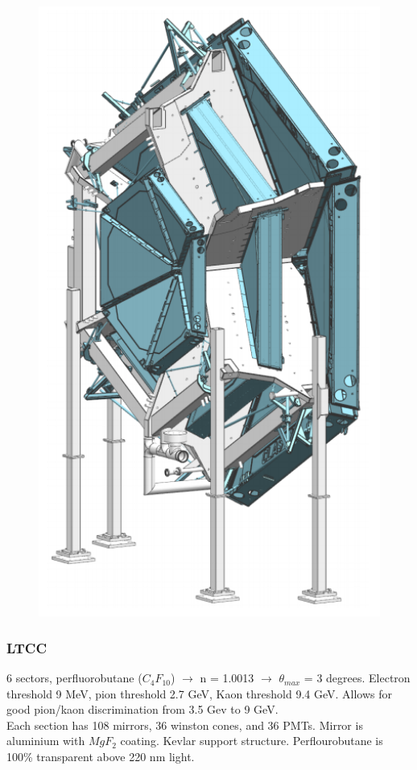             									
			 \begin{figure}[H]
    			\centering
    			\includegraphics[width=12cm]{Chapters/Ch2-Experiment/clas-12-exp/clas-detectors/fd/pics/drift-chambers.png}
			\end{figure}    

            
        \subsubsection{LTCC}
            6 sectors, perfluorobutane ($C_4F_10$) $\longrightarrow$ n = 1.0013 $\longrightarrow$ $\theta_{max}$ = 3 degrees. Electron threshold 9 MeV, pion threshold 2.7 GeV, Kaon threshold 9.4 GeV. Allows for good pion/kaon discrimination from 3.5 Gev to 9 GeV. \\
            Each section has 108 mirrors, 36 winston cones, and 36 PMTs. Mirror is aluminium with $MgF_2$ coating. Kevlar support structure. Perflourobutane is 100\% transparent above 220 nm light. 
            

